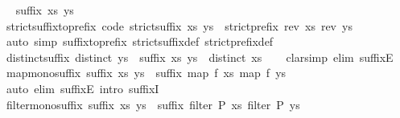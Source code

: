 \begin{isabellebody}
\ \isamarkupfalse%
\ {\isachardoublequoteopen}suffix\ xs\ ys{\isachardoublequoteclose}\ \isacommand{{\isachardot}{\isachardot}}\isamarkupfalse%
\isanewline
{}\isamarkupfalse%
%
\endisatagproof
{\isafoldproof}%
%
\isadelimproof
\isanewline
%
\endisadelimproof
\ \ \isanewline
{}\isamarkupfalse%
\ strict{\isacharunderscore}suffix{\isacharunderscore}to{\isacharunderscore}prefix\ {\isacharbrackleft}code{\isacharbrackright}{\isacharcolon}\ {\isachardoublequoteopen}strict{\isacharunderscore}suffix\ xs\ ys\ {\isasymlongleftrightarrow}\ strict{\isacharunderscore}prefix\ {\isacharparenleft}rev\ xs{\isacharparenright}\ {\isacharparenleft}rev\ ys{\isacharparenright}{\isachardoublequoteclose}\isanewline
%
\isadelimproof
\ \ %
\endisadelimproof
%
\isatagproof
{}\isamarkupfalse%
\ {\isacharparenleft}auto\ simp{\isacharcolon}\ suffix{\isacharunderscore}to{\isacharunderscore}prefix\ strict{\isacharunderscore}suffix{\isacharunderscore}def\ strict{\isacharunderscore}prefix{\isacharunderscore}def{\isacharparenright}%
\endisatagproof
{\isafoldproof}%
%
\isadelimproof
\isanewline
%
\endisadelimproof
\isanewline
{}\isamarkupfalse%
\ distinct{\isacharunderscore}suffix{\isacharcolon}\ {\isachardoublequoteopen}distinct\ ys\ {\isasymLongrightarrow}\ suffix\ xs\ ys\ {\isasymLongrightarrow}\ distinct\ xs{\isachardoublequoteclose}\isanewline
%
\isadelimproof
\ \ %
\endisadelimproof
%
\isatagproof
{}\isamarkupfalse%
\ {\isacharparenleft}clarsimp\ elim{\isacharbang}{\isacharcolon}\ suffixE{\isacharparenright}%
\endisatagproof
{\isafoldproof}%
%
\isadelimproof
\isanewline
%
\endisadelimproof
\isanewline
{}\isamarkupfalse%
\ map{\isacharunderscore}mono{\isacharunderscore}suffix{\isacharcolon}\ {\isachardoublequoteopen}suffix\ xs\ ys\ {\isasymLongrightarrow}\ suffix\ {\isacharparenleft}map\ f\ xs{\isacharparenright}\ {\isacharparenleft}map\ f\ ys{\isacharparenright}{\isachardoublequoteclose}\isanewline
%
\isadelimproof
%
\endisadelimproof
%
\isatagproof
{}\isamarkupfalse%
\ {\isacharparenleft}auto\ elim{\isacharbang}{\isacharcolon}\ suffixE\ intro{\isacharcolon}\ suffixI{\isacharparenright}%
\endisatagproof
{\isafoldproof}%
%
\isadelimproof
\isanewline
%
\endisadelimproof
\isanewline
{}\isamarkupfalse%
\ filter{\isacharunderscore}mono{\isacharunderscore}suffix{\isacharcolon}\ {\isachardoublequoteopen}suffix\ xs\ ys\ {\isasymLongrightarrow}\ suffix\ {\isacharparenleft}filter\ P\ xs{\isacharparenright}\ {\isacharparenleft}filter\ P\ ys{\isacharparenright}{\isachardoublequoteclose}\isanewline

\end{isabellebody}
